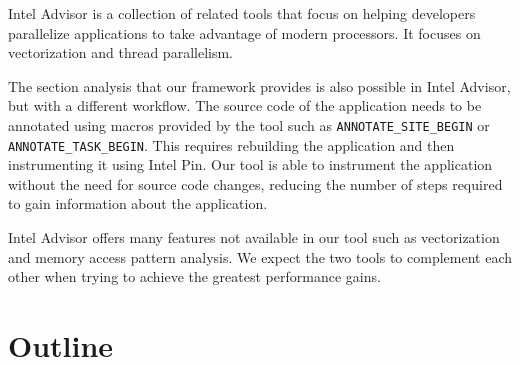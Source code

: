 Intel Advisor \cite{inteladvisor} is a collection of related tools that focus on helping developers parallelize applications to take advantage of modern processors. It focuses on vectorization and thread parallelism.

The section analysis that our framework provides is also possible in Intel Advisor, but with a different workflow. The source code of the application needs to be annotated using macros provided by the tool such as \texttt{ANNOTATE\_SITE\_BEGIN} or \texttt{ANNOTATE\_TASK\_BEGIN}. This requires rebuilding the application and then instrumenting it using Intel Pin. Our tool is able to instrument the application without the need for source code changes, reducing the number of steps required to gain information about the application.

Intel Advisor offers many features not available in our tool such as vectorization and memory access pattern analysis. We expect the two tools to complement each other when trying to achieve the greatest performance gains.

\section {Outline}